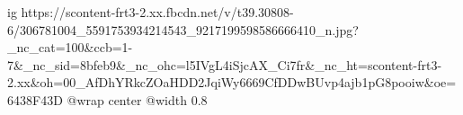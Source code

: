  
 
 
 
 

\ifcmt
  ig https://scontent-frt3-2.xx.fbcdn.net/v/t39.30808-6/306781004_5591753934214543_9217199598586666410_n.jpg?_nc_cat=100&ccb=1-7&_nc_sid=8bfeb9&_nc_ohc=l5IVgL4iSjcAX_Ci7fr&_nc_ht=scontent-frt3-2.xx&oh=00_AfDhYRkcZOaHDD2JqiWy6669CfDDwBUvp4ajb1pG8pooiw&oe=6438F43D
  @wrap center
  @width 0.8
\fi
